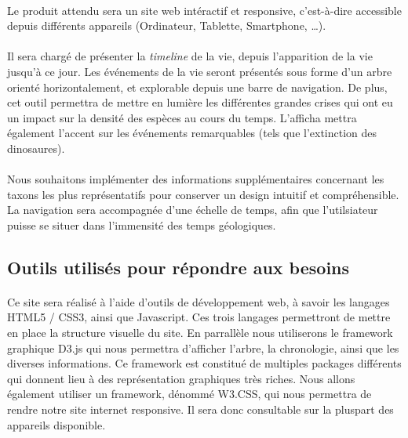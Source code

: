 \documentclass[a4paper]{article}
\begin{document}
		\paragraph{}
		Le produit attendu sera un site web intéractif et responsive, c'est-à-dire accessible depuis différents appareils (Ordinateur, Tablette, Smartphone, \ldots).
		
		\paragraph{}
		Il sera chargé de présenter la \emph{timeline} de la vie, depuis l'apparition de la vie jusqu'à ce jour. Les événements de la vie seront présentés sous forme d'un arbre orienté horizontalement, et explorable depuis une barre de navigation.	De plus, cet outil permettra de mettre en lumière les différentes grandes crises qui ont eu un impact sur la densité des espèces au cours du temps. L'afficha mettra également l'accent sur les événements remarquables (tels que l'extinction des dinosaures). 
		
		\paragraph{}
		Nous souhaitons implémenter des informations supplémentaires concernant les taxons les plus représentatifs pour conserver un design intuitif et compréhensible.
		La navigation sera accompagnée d'une échelle de temps, afin que l'utilsiateur puisse se situer dans l'immensité des temps géologiques.
				

	\subsection{Outils utilisés pour répondre aux besoins}
		\paragraph{}
		Ce site sera réalisé à l'aide d'outils de développement web, à savoir les langages HTML5 / CSS3, ainsi que Javascript. Ces trois langages permettront de mettre en place la structure visuelle du site.
		En parrallèle nous utiliserons le framework graphique D3.js qui nous permettra d'afficher l'arbre, la chronologie, ainsi que les diverses informations. Ce framework est constitué de multiples packages différents qui donnent lieu à des représentation graphiques très riches. Nous allons également utiliser un framework, dénommé W3.CSS, qui nous permettra de rendre notre site internet responsive. Il sera donc consultable sur la pluspart des appareils disponible.
\end{document}

